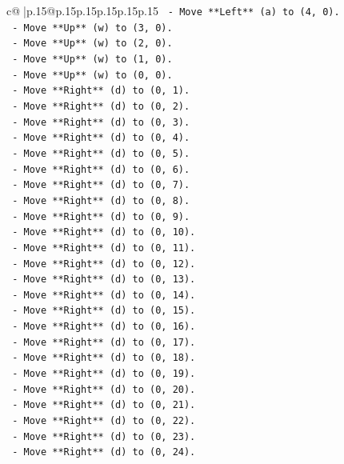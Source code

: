 \documentclass{article}
\begin{document}
{\begin{supertabular}{c@{$\;$}|p{.15\linewidth}@{}p{.15\linewidth}p{.15\linewidth}p{.15\linewidth}p{.15\linewidth}p{.15\linewidth}}
{{{\texttt{    {-} Move **Left** (a) to (4, 0).} \\
\texttt{    {-} Move **Up** (w) to (3, 0).} \\
\texttt{    {-} Move **Up** (w) to (2, 0).} \\
\texttt{    {-} Move **Up** (w) to (1, 0).} \\
\texttt{    {-} Move **Up** (w) to (0, 0).} \\
\texttt{    {-} Move **Right** (d) to (0, 1).} \\
\texttt{    {-} Move **Right** (d) to (0, 2).} \\
\texttt{    {-} Move **Right** (d) to (0, 3).} \\
\texttt{    {-} Move **Right** (d) to (0, 4).} \\
\texttt{    {-} Move **Right** (d) to (0, 5).} \\
\texttt{    {-} Move **Right** (d) to (0, 6).} \\
\texttt{    {-} Move **Right** (d) to (0, 7).} \\
\texttt{    {-} Move **Right** (d) to (0, 8).} \\
\texttt{    {-} Move **Right** (d) to (0, 9).} \\
\texttt{    {-} Move **Right** (d) to (0, 10).} \\
\texttt{    {-} Move **Right** (d) to (0, 11).} \\
\texttt{    {-} Move **Right** (d) to (0, 12).} \\
\texttt{    {-} Move **Right** (d) to (0, 13).} \\
\texttt{    {-} Move **Right** (d) to (0, 14).} \\
\texttt{    {-} Move **Right** (d) to (0, 15).} \\
\texttt{    {-} Move **Right** (d) to (0, 16).} \\
\texttt{    {-} Move **Right** (d) to (0, 17).} \\
\texttt{    {-} Move **Right** (d) to (0, 18).} \\
\texttt{    {-} Move **Right** (d) to (0, 19).} \\
\texttt{    {-} Move **Right** (d) to (0, 20).} \\
\texttt{    {-} Move **Right** (d) to (0, 21).} \\
\texttt{    {-} Move **Right** (d) to (0, 22).} \\
\texttt{    {-} Move **Right** (d) to (0, 23).} \\
\texttt{    {-} Move **Right** (d) to (0, 24).} \\
}}}
\end{supertabular}}
\end{document}
